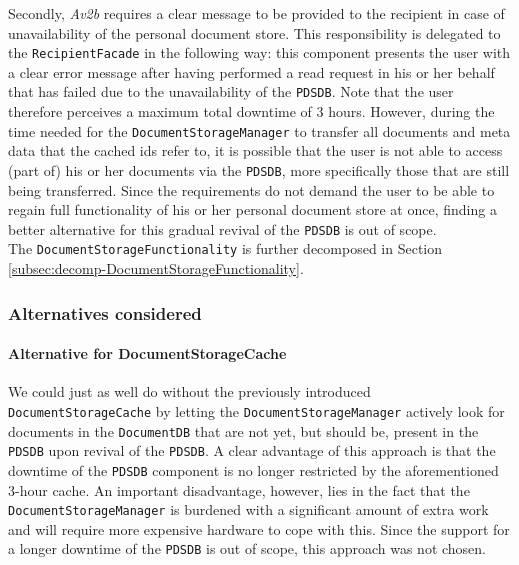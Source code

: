 \documentclass[a4paper,10pt]{article}
\begin{document}
Secondly, \textit{Av2b} requires a clear message to be provided to the recipient in case of unavailability of the personal document store. This responsibility is delegated to the \texttt{RecipientFacade} in the following way: this component presents the user with a clear error message after having performed a read request in his or her behalf that has failed due to the unavailability of the \texttt{PDSDB}. Note that the user therefore perceives a maximum total downtime of 3 hours. However, during the time needed for the \texttt{DocumentStorageManager} to transfer all documents and meta data that the cached ids refer to, it is possible that the user is not able to access (part of) his or her documents via the \texttt{PDSDB}, more specifically those that are still being transferred. Since the requirements do not demand the user to be able to regain full functionality of his or her personal document store at once, finding a better alternative for this gradual revival of the \texttt{PDSDB} is out of scope.\\
The \texttt{DocumentStorageFunctionality} is further decomposed in Section \ref{subsec:decomp-DocumentStorageFunctionality}.
\subsubsection*{Alternatives considered}
\paragraph{Alternative for DocumentStorageCache}
We could just as well do without the previously introduced \texttt{DocumentStorageCache} by letting the \texttt{DocumentStorageManager} actively look for documents in the \texttt{DocumentDB} that are not yet, but should be, present in the \texttt{PDSDB} upon revival of the \texttt{PDSDB}. A clear advantage of this approach is that the downtime of the \texttt{PDSDB} component is no longer restricted by the aforementioned 3-hour cache. An important disadvantage, however, lies in the fact that the \texttt{DocumentStorageManager} is burdened with a significant amount of extra work and will require more expensive hardware to cope with this. Since the support for a longer downtime of the \texttt{PDSDB} is out of scope, this approach was not chosen.

\end{document}
